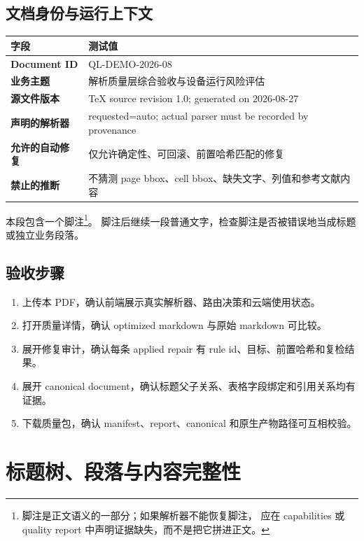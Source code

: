 \documentclass[UTF8,a4paper,11pt]{ctexart}
\begin{document}
\subsection{文档身份与运行上下文}

\begin{tabularx}{\textwidth}{>{\bfseries}p{} Y}
\toprule
字段 & 测试值 \\
\midrule
Document ID & QL-DEMO-2026-08 \\
业务主题 & 解析质量层综合验收与设备运行风险评估 \\
源文件版本 & TeX source revision 1.0; generated on 2026-08-27 \\
声明的解析器 & requested=auto; actual parser must be recorded by provenance \\
允许的自动修复 & 仅允许确定性、可回滚、前置哈希匹配的修复 \\
禁止的推断 & 不猜测 page bbox、cell bbox、缺失文字、列值和参考文献内容 \\
\bottomrule
\end{tabularx}

本段包含一个脚注\footnote{脚注是正文语义的一部分；如果解析器不能恢复脚注，
应在 capabilities 或 quality report 中声明证据缺失，而不是把它拼进正文。}。
脚注后继续一段普通文字，检查脚注是否被错误地当成标题或独立业务段落。

\subsection{验收步骤}

\begin{enumerate}[leftmargin=2em]
  \item 上传本 PDF，确认前端展示真实解析器、路由决策和云端使用状态。
  \item 打开质量详情，确认 optimized markdown 与原始 markdown 可比较。
  \item 展开修复审计，确认每条 applied repair 有 rule id、目标、前置哈希和复检结果。
  \item 展开 canonical document，确认标题父子关系、表格字段绑定和引用关系均有证据。
  \item 下载质量包，确认 manifest、report、canonical 和原生产物路径可互相校验。
\end{enumerate}

\section{标题树、段落与内容完整性}
\end{document}
